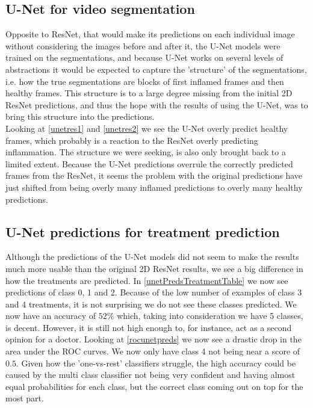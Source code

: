 \subsection{U-Net for video segmentation}
Opposite to ResNet, that would make its predictions on each individual image without considering the images before and after it, the U-Net models were trained on the segmentations, and because U-Net works on several levels of abstractions it would be expected to capture the 'structure' of the segmentations, i.e. how the true segmentations are blocks of first inflamed frames and then healthy frames. This structure is to a large degree missing from the initial 2D ResNet predictions, and thus the hope with the results of using the U-Net, was to bring this structure into the predictions.\\
Looking at \autoref{unetres1} and \autoref{unetres2} we see the U-Net overly predict healthy frames, which probably is a reaction to the ResNet overly predicting inflammation. The structure we were seeking, is also only brought back to a limited extent. Because the U-Net predictions overrule the correctly predicted frames from the ResNet, it seems the problem with the original predictions have just shifted from being overly many inflamed predictions to overly many healthy predictions. 

\subsection{U-Net predictions for treatment prediction}
Although the predictions of the U-Net models did not seem to make the results much more usable than the original 2D ResNet results, we see a big difference in how the treatments are predicted. In \autoref{unetPredsTreatmentTable} we now see predictions of class 0, 1 and 2. Because of the low number of examples of class 3 and 4 treatments, it is not surprising we do not see these classes predicted. We now have an accuracy of $52\%$ which, taking into consideration we have 5 classes, is decent. However, it is still not high enough to, for instance, act as a second opinion for a doctor. Looking at \autoref{rocunetpreds} we now see a drastic drop in the area under the ROC curves. We now only have class 4 not being near a score of $0.5$. Given how the 'one-vs-rest' classifiers struggle, the high accuracy could be caused by the multi class classifier not being very confident and having almost equal probabilities for each class, but the correct class coming out on top for the most part.

